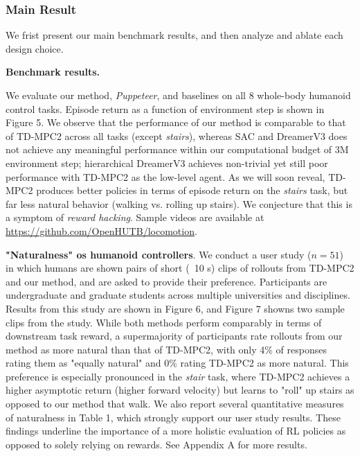 \documentclass[sn-mathphys-num]{sn-jnl}%
\theoremstyle{thmstyleone}	%
\theoremstyle{thmstyletwo}	%
\theoremstyle{thmstylethree}	%
\begin{document}
\subsubsection{Main Result}

We frist present our main benchmark results, 
and then analyze and ablate each design choice.


\textbf{Benchmark results.}

We evaluate our method, \textit{Puppeteer}, and baselines on all 8 whole-body humanoid control tasks.
Episode return as a function of environment step is shown in Figure 5.
We observe that the performance of our method is comparable to that of TD-MPC2 across all tasks (except \textit{stairs}), 
whereas SAC and DreamerV3 does not achieve any meaningful performance within our computational budget of 3M environment step;
hierarchical DreamerV3 achieves non-trivial yet still poor performance with TD-MPC2 as the low-level agent.
As we will soon reveal, TD-MPC2 produces better policies in terms of episode return on the \textit{stairs} task,
but far less natural behavior (walking vs. rolling up stairs).
We conjecture that this is a symptom of \textit{reward hacking}.
Sample videos are available at \href{https://github.com/OpenHUTB/locomotion}{https://github.com/OpenHUTB/locomotion}.


\textbf{"Naturalness" os humanoid controllers}.
We conduct a user study ($ n = 51 $) in which humans are shown pairs of short (~10 s) clips of rollouts from TD-MPC2 and our method, 
and are asked to provide their preference.
Participants are undergraduate and graduate students across multiple universities and disciplines.
Results from this study are shown in Figure 6, and Figure 7 showns two sample clips from the study.
While both methods perform comparably in terms of downstream task reward, a supermajority of participants rate rollouts from our method as more natural than that of TD-MPC2, with only 4\% of responses rating them as "equally natural" and 0\% rating TD-MPC2 as more natural.
This preference is especially pronounced in the \textit{stair} task, where TD-MPC2 achieves a higher asymptotic return (higher forward velocity) but learns to "roll" up stairs as opposed to our method that walk.
We also report several quantitative measures of naturalness in Table 1, which strongly support our user study results.
These findings underline the importance of a more holistic evaluation of RL policies as opposed to solely relying on rewards.
See Appendix A for more results.
\end{document}
